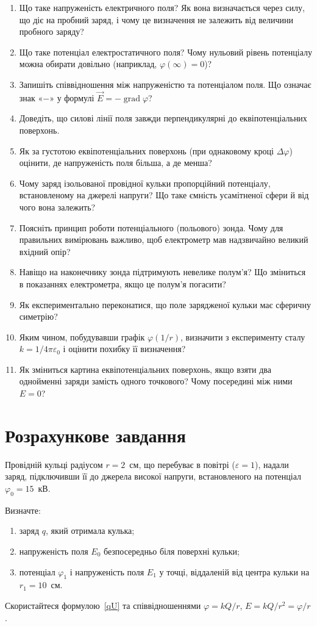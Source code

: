 \begin{enumerate}
\item Що таке напруженість електричного поля? Як вона визначається через силу, що діє на пробний заряд, і чому це визначення не залежить від величини пробного заряду?
\item Що таке потенціал електростатичного поля? Чому нульовий рівень потенціалу можна обирати довільно (наприклад, $\varphi(\infty)=0$)?
\item Запишіть співвідношення між напруженістю та потенціалом поля. Що означає знак «$-$» у формулі $\vec E = -\operatorname{grad}\varphi$?
\item Доведіть, що силові лінії поля завжди перпендикулярні до еквіпотенціальних поверхонь.
\item Як за густотою еквіпотенціальних поверхонь (при однаковому кроці $\Delta\varphi$) оцінити, де напруженість поля більша, а де менша?
\item Чому заряд ізольованої провідної кульки пропорційний потенціалу, встановленому на джерелі напруги? Що таке ємність усамітненої сфери й від чого вона залежить?
\item Поясніть принцип роботи потенціального (польового) зонда. Чому для правильних вимірювань важливо, щоб електрометр мав надзвичайно великий вхідний опір?
\item Навіщо на наконечнику зонда підтримують невелике полум'я? Що зміниться в показаннях електрометра, якщо це полум'я погасити?
\item Як експериментально переконатися, що поле зарядженої кульки має сферичну симетрію?
\item Яким чином, побудувавши графік $\varphi(1/r)$, визначити з експерименту сталу $k = 1/4\pi\varepsilon_0$ і оцінити похибку її визначення?
\item Як зміниться картина еквіпотенціальних поверхонь, якщо взяти два однойменні заряди замість одного точкового? Чому посередині між ними $E=0$?
\end{enumerate}

\section*{Розрахункове завдання}

Провідній кульці радіусом $r = 2$~см, що перебуває в повітрі ($\varepsilon = 1$), надали заряд, підключивши її до джерела високої напруги, встановленого на потенціал $\varphi_0 = 15$~кВ.

Визначте:
\begin{enumerate}
\item заряд $q$, який отримала кулька;
\item напруженість поля $E_0$ безпосередньо біля поверхні кульки;
\item потенціал $\varphi_1$ і напруженість поля $E_1$ у точці, віддаленій від центра кульки на $r_1 = 10$~см.
\end{enumerate}

Скористайтеся формулою~\eqref{qU} та співвідношеннями $\varphi = kQ/r$, $E = kQ/r^2 = \varphi/r$.
